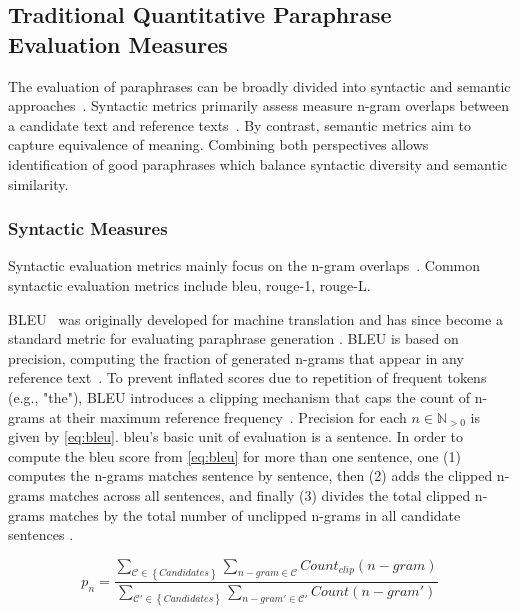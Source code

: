 \subsection{Traditional Quantitative Paraphrase Evaluation Measures}
\label{subsec:traditional_quantitative_evaluation_measures}

The evaluation of paraphrases can be broadly divided into syntactic and semantic approaches~\citep{gohsen_captions_2023}. 
Syntactic metrics primarily assess measure n-gram overlaps between a candidate text and reference texts~\citep{zhou_paraphrase_2021}. 
By contrast, semantic metrics aim to capture equivalence of meaning. 
Combining both perspectives allows identification of good paraphrases which balance syntactic diversity and semantic similarity.


\subsubsection{Syntactic Measures}
Syntactic evaluation metrics mainly focus on the n-gram overlaps~\citet{zhou_paraphrase_2021}. 
Common syntactic evaluation metrics include \acs{bleu}, \acs{rouge}-1, \acs{rouge}-L.

BLEU~\citep{papineni_bleu_2001} was originally developed for machine translation and has since become a standard metric for evaluating paraphrase generation \citep{zhou_paraphrase_2021}. 
BLEU is based on precision, computing the fraction of generated n-grams that appear in any reference text~\citep{kurt_pehlivanoglu_comparative_2024,palivela_optimization_2021,papineni_bleu_2001}. 
To prevent inflated scores due to repetition of frequent tokens (e.g., "the"), BLEU introduces a clipping mechanism that caps the count of n-grams at their maximum reference frequency~\citep{papineni_bleu_2001}. 
Precision for each $n \in \mathbb{N}_{>0}$ is given by \autoref{eq:bleu}.
\ac{bleu}'s basic unit of evaluation is a sentence. 
In order to compute the \ac{bleu} score from \autoref{eq:bleu} for more than one sentence, 
one (1) computes the n-grams matches sentence by sentence, 
then (2) adds the clipped n-grams matches across all sentences, 
and finally (3) divides the total clipped n-grams matches by 
the total number of unclipped n-grams in all candidate sentences \citep{papineni_bleu_2001}.

\begin{equation}
    p_n = \frac{\sum_{\mathcal{C} \in \left\{ Candidates \right\}}\sum_{n-gram \in\mathcal{C}}Count_{clip}(n-gram)}{\sum_{\mathcal{C'} \in \left\{ Candidates \right\}}\sum_{n-gram' \in\mathcal{C'}}Count(n-gram')}
\label{eq:bleu}
\end{equation}

